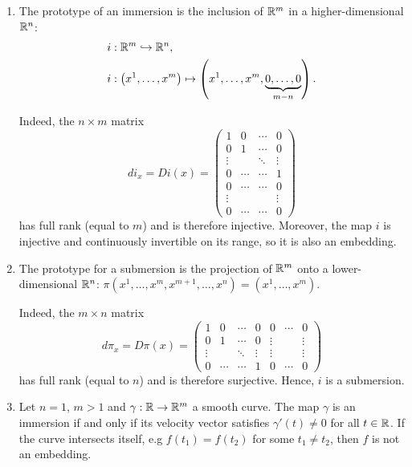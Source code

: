 \begin{example}
  \begin{enumerate}
    \item The prototype of an immersion is the inclusion of $\mathbb{R}^m$ in a higher-dimensional $\mathbb{R}^n$:
    \begin{align}
      i &: \R^m \hookrightarrow \R^n,\\
      i &: \left(x^1, \ldots, x^m\right) \mapsto \left(x^1, \ldots, x^m, \LaTeXunderbrace{0, \ldots, 0}_{m-n}\right).
    \end{align}
    
    Indeed, the $n\times m$ matrix
    \begin{equation}
      di_x = Di(x)
       = \begin{pmatrix}
        1 & 0 & \cdots & 0 \\
        0 & 1 & \cdots & 0 \\
        \vdots & & \ddots & \vdots \\
        0 & \cdots & \cdots & 1 \\
        0 & \cdots & \cdots & 0 \\
        \vdots & & & \vdots \\
        0 & \cdots & \cdots & 0
       \end{pmatrix}
    \end{equation}
    has full rank (equal to $m$) and is therefore injective.
    Moreover, the map $i$ is injective and continuously invertible on its range, so it is also an embedding.

    \item The prototype for a submersion is the projection of $\mathbb{R}^m$ onto a lower-dimensional $\mathbb{R}^n$: $\pi\left(x^1,\ldots,x^m,x^{m+1},\ldots,x^n\right) = \left(x^1,\ldots,x^m\right)$.
    
    Indeed, the $m\times n$ matrix
    \begin{equation}
      d\pi_x = D\pi(x)
       = \begin{pmatrix}
        1 & 0 & \cdots & 0 & 0 & \cdots & 0 \\
        0 & 1 & \cdots & 0 & \vdots & & \vdots \\
        \vdots & & \ddots & \vdots & \vdots & & \vdots \\
        0 & \cdots & \cdots & 1 & 0 & \cdots & 0
       \end{pmatrix}
    \end{equation}
    has full rank (equal to $n$) and is therefore surjective.
    Hence, $i$ is a submersion.

    \item Let $n=1$, $m > 1$ and $\gamma:\mathbb{R}\to\mathbb{R}^m$ a smooth curve.
    The map $\gamma$ is an immersion if and only if its velocity vector satisfies $\gamma'(t)\neq0$ for all $t\in\mathbb{R}$.
    If the curve intersects itself, e.g $f(t_1) = f(t_2)$ for some $t_1\neq t_2$, then $f$ is not an embedding.
  \end{enumerate}
\end{example}

